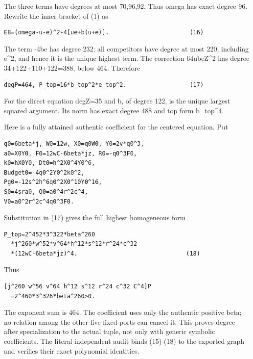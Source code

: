 The three terms have degrees at most 70,96,92. Thus omega has exact degree 96. Rewrite the inner bracket of (1) as



\begin{verbatim}
E8=(omega-u-e)^2-4[ue+b(u+e)].                       (16)
\end{verbatim}

The term -4be has degree 232; all competitors have degree at most 220, including e\textasciicircum{}\allowbreak{}2, and hence it is the unique highest term. The correction 64ubeZ\textasciicircum{}\allowbreak{}2 has degree 34+\allowbreak{}122+\allowbreak{}110+\allowbreak{}122=\allowbreak{}388, below 464. Therefore



\begin{verbatim}
degP=464, P_top=16*b_top^2*e_top^2.                  (17)
\end{verbatim}

For the direct equation degZ=\allowbreak{}35 and b, of degree 122, is the unique largest squared argument. Its norm has exact degree 488 and top form b\_\allowbreak{}top\textasciicircum{}\allowbreak{}4.



Here is a fully attained authentic coefficient for the centered equation. Put



\begin{verbatim}
q0=6beta*j, W0=12w, X0=q0W0, Y0=2v*q0^3,
a0=X0Y0, F0=12wC-6beta*jz, R0=-q0^3F0,
k0=hX0Y0, Dt0=h^2X0^4Y0^6,
Budget0=-4q0^2Y0^2k0^2,
Pg0=-12s^2h^6q0^2X0^10Y0^16,
S0=4sra0, Q0=a0^4r^2c^4,
V0=a0^2r^2c^4q0^3F0.
\end{verbatim}

Substitution in (17) gives the full highest homogeneous form



\begin{verbatim}
P_top=2^452*3^322*beta^260
  *j^260*w^52*v^64*h^12*s^12*r^24*c^32
  *(12wC-6beta*jz)^4.                               (18)
\end{verbatim}

Thus



\begin{verbatim}
[j^260 w^56 v^64 h^12 s^12 r^24 c^32 C^4]P
  =2^460*3^326*beta^260>0.
\end{verbatim}

The exponent sum is 464. The coefficient uses only the authentic positive beta; no relation among the other five fixed ports can cancel it. This proves degree after specialization to the actual tuple, not only with generic symbolic coefficients. The literal independent audit binds (15)-(18) to the exported graph and verifies their exact polynomial identities.



